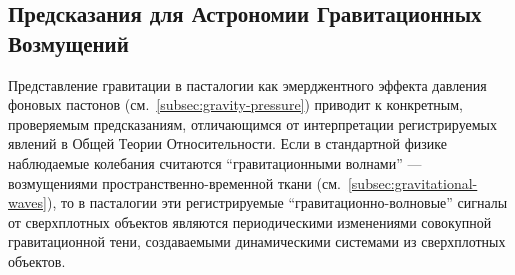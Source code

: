 \documentclass[pdflatex,sn-mathphys-num,referee]{sn-jnl}
\begin{document}
\subsection{Предсказания для Астрономии Гравитационных Возмущений}\label{subsec:gravitational-astronomy}

Представление гравитации в пасталогии как эмерджентного эффекта давления фоновых пастонов (см.~\ref{subsec:gravity-pressure}) приводит к конкретным, проверяемым предсказаниям, отличающимся от интерпретации регистрируемых явлений в Общей Теории Относительности. Если в стандартной физике наблюдаемые колебания считаются ``гравитационными волнами'' --- возмущениями пространственно-временной ткани (см.~\ref{subsec:gravitational-waves}), то в пасталогии эти регистрируемые ``гравитационно-волновые'' сигналы от сверхплотных объектов являются периодическими изменениями совокупной гравитационной тени, создаваемыми динамическими системами из сверхплотных объектов.
\end{document}
